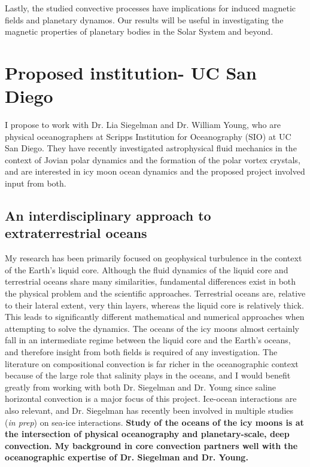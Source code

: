 \documentclass[12pt]{article}
\begin{document}
Lastly, the studied convective processes have implications for induced magnetic fields and planetary dynamos. Our results will be useful in investigating the magnetic properties of planetary bodies in the Solar System and beyond.

\section{Proposed institution- UC San Diego}
I propose to work with Dr. Lia Siegelman and Dr. William Young, who are physical oceanographers at Scripps Institution for Oceanography (SIO) at UC San Diego. 
They have recently investigated astrophysical fluid mechanics in the context of Jovian polar dynamics and the formation of the polar vortex crystals\cite{lS22,lS22b,lS24}, and are interested in icy moon ocean dynamics and the proposed project involved input from both.

\subsection{An interdisciplinary approach to extraterrestrial oceans}
My research has been primarily focused on geophysical turbulence in the context of the Earth's liquid core. Although the fluid dynamics of the liquid core and terrestrial oceans share many similarities, fundamental differences exist in both the physical problem and the scientific approaches. Terrestrial oceans are, relative to their lateral extent, very thin layers, whereas the liquid core is relatively thick. This leads to significantly different mathematical and numerical approaches when attempting to solve the dynamics.
The oceans of the icy moons almost certainly fall in an intermediate regime between the liquid core and the Earth's oceans, and therefore insight from both fields is required of any investigation. The literature on compositional convection is far richer in the oceanographic context because of the large role that salinity plays in the oceans, and I would benefit greatly from working with both Dr. Siegelman and Dr. Young since saline horizontal convection is a major focus of this project. 
Ice-ocean interactions are also relevant, and Dr. Siegelman has recently been involved in multiple studies (\textit{in prep}) on sea-ice interactions. 
\textbf{Study of the oceans of the icy moons is at the intersection of physical oceanography and planetary-scale, deep convection. My background in core convection partners well with the oceanographic expertise of Dr. Siegelman and Dr. Young.}
\end{document}
